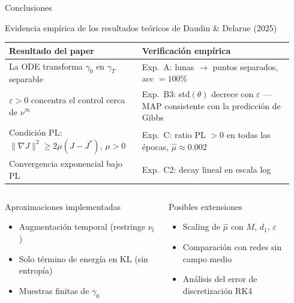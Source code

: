 \documentclass[10pt]{beamer}
\begin{document}
\begin{frame}{Conclusiones}

\begin{block}{Evidencia empírica de los resultados teóricos de Daudin \& Delarue (2025)}
\begin{tabular}{p{0.44\linewidth}p{0.50\linewidth}}
  \toprule
  Resultado del paper & Verificación empírica \\
  \midrule
  La ODE transforma $\gamma_0$ en $\gamma_T$ separable &
    Exp.\ A: lunas $\to$ puntos separados, acc $= 100\%$ \\[4pt]
  $\varepsilon>0$ concentra el control cerca de $\nu^\infty$ &
    Exp.\ B3: std$(\theta)$ decrece con $\varepsilon$ — MAP consistente con la predicción de Gibbs \\[4pt]
  Condición PL: $\|\nabla J\|^2\geq 2\mu(J-J^*)$, $\mu>0$ &
    Exp.\ C: ratio PL $>0$ en todas las épocas, $\hat\mu\approx 0.002$ \\[4pt]
  Convergencia exponencial bajo PL &
    Exp.\ C2: decay lineal en escala log \\
  \bottomrule
\end{tabular}
\end{block}

\bigskip
\begin{columns}
\begin{alertblock}{Aproximaciones implementadas}
  \begin{itemize}
    \item Augmentación temporal (restringe $\nu_t$)
    \item Solo término de energía en KL (sin entropía)
    \item Muestras finitas de $\gamma_0$
  \end{itemize}
\end{alertblock}
\begin{block}{Posibles extensiones}
  \begin{itemize}
    \item Scaling de $\hat\mu$ con $M$, $d_1$, $\varepsilon$
    \item Comparación con redes sin campo medio
    \item Análisis del error de discretización RK4
  \end{itemize}
\end{block}
\end{columns}

\end{frame}
\end{document}
